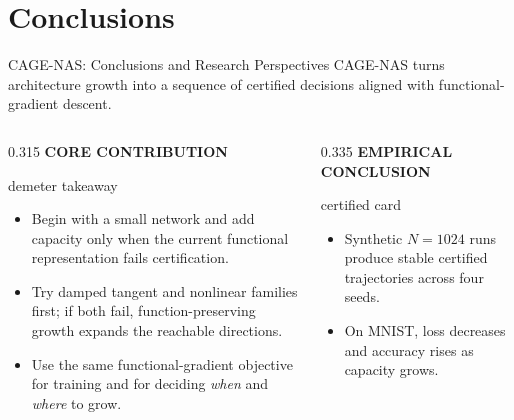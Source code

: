\section{Conclusions}

\begin{frame}[t]{CAGE-NAS: Conclusions and Research Perspectives}
  \vspace{-0.13cm}
  {\fontsize{7.45}{8.9}\selectfont
  CAGE-NAS turns architecture growth into a sequence of certified decisions
  aligned with functional-gradient descent.}

  \vspace{0.10cm}
  \begin{columns}[T,onlytextwidth]
    \begin{column}{0.315\textwidth}
      {\color{EnstaBlue}\bfseries\scriptsize CORE CONTRIBUTION}
      \vspace{0.04cm}

      \begin{beamercolorbox}[rounded=true,sep=0.11cm,wd=\linewidth]{demeter takeaway}
        {\fontsize{6.85}{8.2}\selectfont
        \begin{itemize}
          \setlength{\itemsep}{0.08cm}
          \item Begin with a small network and add capacity only when the
                current functional representation fails certification.
          \item Try damped tangent and nonlinear families first; if both fail,
                function-preserving growth expands the reachable directions.
          \item Use the same functional-gradient objective for training and
                for deciding \emph{when} and \emph{where} to grow.
        \end{itemize}}
      \end{beamercolorbox}
    \end{column}

    \begin{column}{0.335\textwidth}
      {\color{EnstaBlue}\bfseries\scriptsize EMPIRICAL CONCLUSION}
      \vspace{0.04cm}

      \begin{beamercolorbox}[rounded=true,sep=0.11cm,wd=\linewidth]{certified card}
        {\fontsize{6.85}{8.2}\selectfont
        \begin{itemize}
          \setlength{\itemsep}{0.09cm}
          \item Synthetic $N=1024$ runs produce stable certified trajectories
                across four seeds.
          \item On MNIST, loss decreases and accuracy rises as capacity grows.
        \end{itemize}}


\end{beamercolorbox}
\end{column}
\end{columns}
\end{frame}
